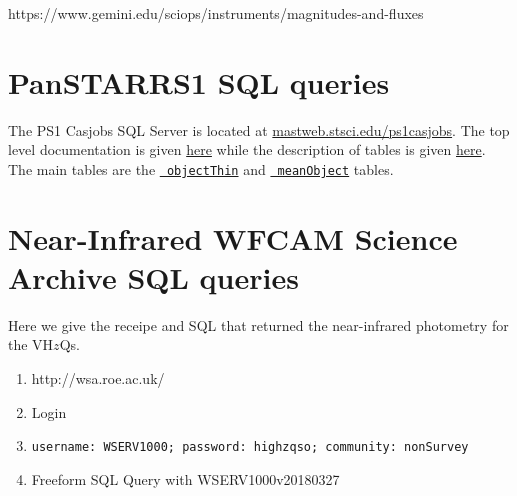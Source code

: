 \documentclass[usenatbib]{mnras}
\begin{document}
https://www.gemini.edu/sciops/instruments/magnitudes-and-fluxes

\section{PanSTARRS1 SQL queries}\label{sec:PS1_SQL}
The PS1 Casjobs SQL Server is located at
\href{http://mastweb.stsci.edu/ps1casjobs}{mastweb.stsci.edu/ps1casjobs}.
The top level documentation is given
\href{https://outerspace.stsci.edu/display/PANSTARRS/PS1+Source+extraction+and+catalogs}{here}
while the description of tables is given
\href{https://outerspace.stsci.edu/display/PANSTARRS/PS1+Source+extraction+and+catalogs#PS1Sourceextractionandcatalogs}{here}. The
main tables are the
\href{https://outerspace.stsci.edu/display/PANSTARRS/PS1+ObjectThin+table+fields}{{\tt
objectThin}} and
\href{https://outerspace.stsci.edu/display/PANSTARRS/PS1+MeanObject+table+fields}{{\tt
meanObject}} tables.

\section{Near-Infrared WFCAM Science Archive SQL queries}\label{sec:SQL}
Here we give the receipe and SQL that returned the near-infrared photometry 
for the VH$z$Qs. 

\begin{enumerate}
\item http://wsa.roe.ac.uk/ 
\item Login
\item {\tt username:	WSERV1000;  password: 	highzqso;   community: 	nonSurvey} 
\item Freeform SQL Query with  WSERV1000v20180327
\end{enumerate}













%


\end{document}
